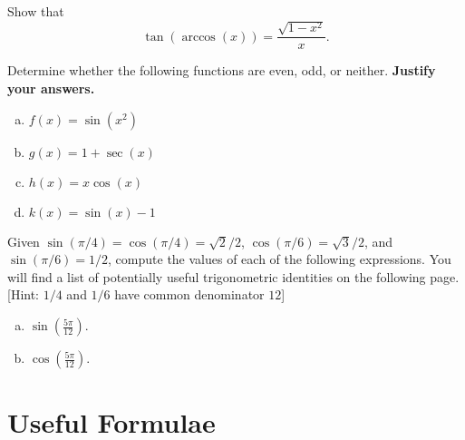 \documentclass[12pt]{amsart}
\begin{document}
\begin{thm}
  Show that
  $$\tan(\arccos(x)) = \frac{\sqrt{1 - x^2}}{x}.$$
\end{thm}

\newpage
\begin{thm}
  Determine whether the following functions are even, odd, or neither.
  {\bf Justify your answers.}
  \begin{enumerate}[(a)]
  \item
    $f(x) = \sin(x^2)$
    \vspace{2in}
  \item
    $g(x) = 1 + \sec(x)$
    \vspace{2in}
  \item
    $h(x) = x\cos(x)$
    \vspace{2in}
  \item
    $k(x) = \sin(x) - 1$
  \end{enumerate}
  
\end{thm}

\newpage

\begin{thm}
  Given $\sin(\pi/4) = \cos(\pi/4) = \sqrt{2}/2$, $\cos(\pi/6) = \sqrt{3}/2$, and $\sin(\pi/6) = 1/2$, compute the values of each of the following expressions.
  You will find a list of potentially useful trigonometric identities on the following page.
  [Hint: $1/4$ and $1/6$ have common denominator $12$]
  \begin{enumerate}[(a)]
  \item
    $\displaystyle{\sin\left(\frac{5\pi}{12}\right)}$.
    \vspace{3in}
  \item
    $\displaystyle{\cos\left(\frac{5\pi}{12}\right)}$.
    \vspace{3in}
  \end{enumerate}
\end{thm}

\newpage

\section{Useful Formulae}
\end{document}
